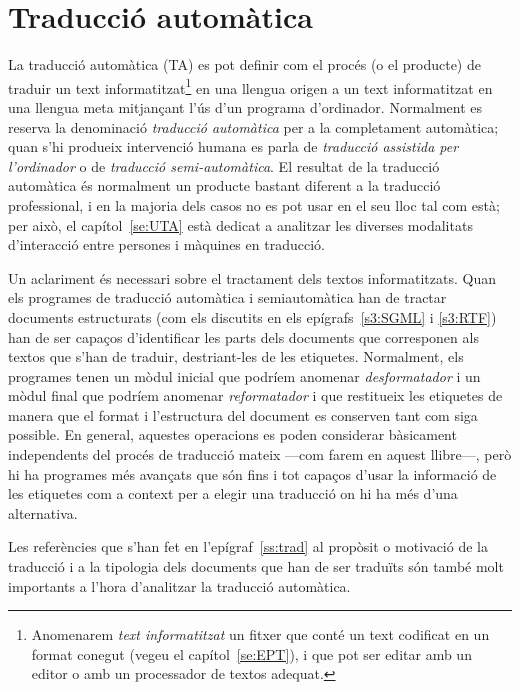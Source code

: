 \section{Traducció automàtica}
\label{ss:TA}


La traducció automàtica (TA) es pot definir com el procés (o el
producte) de traduir un text informatitzat\footnote{Anomenarem
  \emph{text informatitzat} un fitxer que conté un text codificat en
  un format conegut (vegeu el capítol~\ref{se:EPT}), i que pot ser
  editar amb un editor o amb un processador de textos adequat.} en una
llengua origen a un text informatitzat en una llengua meta mitjançant
l'ús d'un programa d'ordinador. Normalment es reserva la denominació
\emph{traducció automàtica} per a la completament automàtica; quan
s'hi produeix intervenció humana es parla de {\em traducció assistida
  per l'ordinador} o de \emph{traducció semi-automàtica}.  El resultat
de la traducció automàtica és normalment un producte bastant diferent
a la traducció professional, i en la majoria dels casos no es pot usar
en el seu lloc tal com està; per això, el capítol~\ref{se:UTA} està
dedicat a analitzar les diverses modalitats d'interacció entre
persones i màquines en traducció.

Un aclariment és necessari sobre el tractament dels textos
informatitzats. Quan els programes de traducció automàtica i
semiautomàtica han de tractar documents estructurats (com els
discutits en els epígrafs~\ref{s3:SGML} i \ref{s3:RTF}) han de ser
capaços d'identificar les parts dels documents que corresponen als
textos que s'han de traduir, destriant-les de les etiquetes.
Normalment, els programes tenen un mòdul inicial que podríem anomenar
\emph{desformatador} i un mòdul final que podríem anomenar
\emph{reformatador} i que restitueix les etiquetes de manera que el
format i l'estructura del document es conserven tant com siga
possible. En general, aquestes operacions es poden considerar
bàsicament independents del procés de traducció mateix ---com farem en
aquest llibre---, però hi ha programes més avançats que són fins i tot
capaços d'usar la informació de les etiquetes com a context per a
elegir una traducció on hi ha més d'una alternativa.

Les referències que s'han fet en l'epígraf~\ref{ss:trad} al propòsit o
motivació de la traducció i a la tipologia dels documents que han de
ser traduïts són també molt importants a l'hora d'analitzar la
traducció automàtica.


